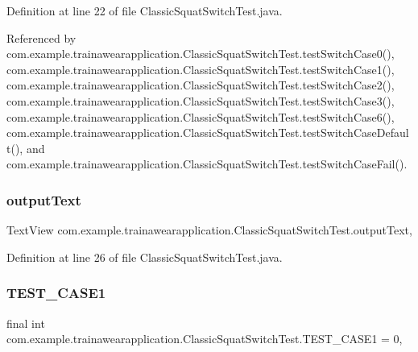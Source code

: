 Definition at line 22 of file Classic\+Squat\+Switch\+Test.\+java.



Referenced by com.\+example.\+trainawearapplication.\+Classic\+Squat\+Switch\+Test.\+test\+Switch\+Case0(), com.\+example.\+trainawearapplication.\+Classic\+Squat\+Switch\+Test.\+test\+Switch\+Case1(), com.\+example.\+trainawearapplication.\+Classic\+Squat\+Switch\+Test.\+test\+Switch\+Case2(), com.\+example.\+trainawearapplication.\+Classic\+Squat\+Switch\+Test.\+test\+Switch\+Case3(), com.\+example.\+trainawearapplication.\+Classic\+Squat\+Switch\+Test.\+test\+Switch\+Case6(), com.\+example.\+trainawearapplication.\+Classic\+Squat\+Switch\+Test.\+test\+Switch\+Case\+Default(), and com.\+example.\+trainawearapplication.\+Classic\+Squat\+Switch\+Test.\+test\+Switch\+Case\+Fail().

\mbox{\label{classcom_1_1example_1_1trainawearapplication_1_1_classic_squat_switch_test_a5942ceb5c90ba3b912bb91020e3989ee}} 
\subsubsection{\texorpdfstring{outputText}{outputText}}
{\footnotesize\ttfamily Text\+View com.\+example.\+trainawearapplication.\+Classic\+Squat\+Switch\+Test.\+output\+Text\hspace{0.3cm}{\ttfamily [static]}, {\ttfamily [private]}}



Definition at line 26 of file Classic\+Squat\+Switch\+Test.\+java.

\mbox{\label{classcom_1_1example_1_1trainawearapplication_1_1_classic_squat_switch_test_ad7aca3b01b79d4797ff05766d3e15059}} 
\subsubsection{\texorpdfstring{TEST\_CASE1}{TEST\_CASE1}}
{\footnotesize\ttfamily final int com.\+example.\+trainawearapplication.\+Classic\+Squat\+Switch\+Test.\+T\+E\+S\+T\+\_\+\+C\+A\+S\+E1 = 0\hspace{0.3cm}{\ttfamily [static]}, {\ttfamily [private]}}



